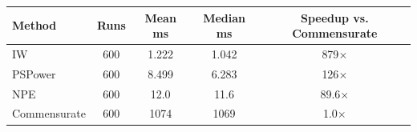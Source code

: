 \begin{tabular}{lcccc}
\toprule
Method & Runs & Mean ms & Median ms & Speedup vs. Commensurate \\
\midrule
IW & 600 & 1.222 & 1.042 & 879$\times$ \\
PSPower & 600 & 8.499 & 6.283 & 126$\times$ \\
NPE & 600 & 12.0 & 11.6 & 89.6$\times$ \\
Commensurate & 600 & 1074 & 1069 & 1.0$\times$ \\
\bottomrule
\end{tabular}
